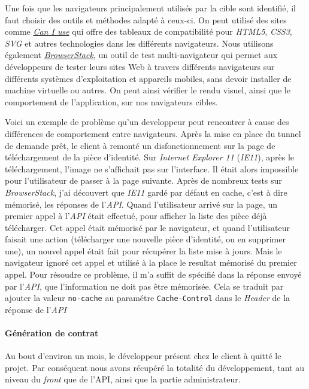 Une fois que les navigateurs principalement utilisés par la cible sont
identifié, il faut choisir des outils et méthodes adapté à ceux-ci. On
peut utilisé des sites comme \href{http://caniuse.com/}{\emph{Can I
use}} qui offre des tableaux de compatibilité pour \emph{HTML5},
\emph{CSS3}, \emph{SVG} et autres technologies dans les différents
navigateurs. Nous utilisons également
\href{https://www.browserstack.com/}{\emph{BrowserStack}}, un outil de
test multi-navigateur qui permet aux développeurs de tester leurs sites
Web à travers différents navigateurs sur différents systèmes
d'exploitation et appareils mobiles, sans devoir installer de machine
virtuelle ou autres. On peut ainsi vérifier le rendu visuel, ainsi que
le comportement de l'application, sur nos navigateurs cibles.

\bigskip

Voici un exemple de problème qu'un developpeur peut rencontrer à cause
des différences de comportement entre navigateurs. Après la mise en
place du tunnel de demande prêt, le client à remonté un
disfonctionnement sur la page de téléchargement de la pièce d'identité.
Sur \emph{Internet Explorer 11} (\emph{IE11}), après le téléchargement,
l'image ne s'affichait pas sur l'interface. Il était alors impossible
pour l'utilisateur de passer à la page suivante. Après de nombreux tests
sur \emph{BrowserStack}, j'ai découvert que \emph{IE11} gardé par défaut
en cache, c'est à dire mémorisé, les réponses de l'\emph{API}. Quand
l'utilisateur arrivé sur la page, un premier appel à l'\emph{API} était
effectué, pour afficher la liste des pièce déjà télécharger. Cet appel
était mémorisé par le navigateur, et quand l'utilisateur faisait une
action (télécharger une nouvelle pièce d'identité, ou en supprimer une),
un nouvel appel était fait pour récupérer la liste mise à jours. Mais le
navigateur ignoré cet appel et utilisé à la place le resultat mémorisé
du premier appel. Pour résoudre ce problème, il m'a suffit de spécifié
dans la réponse envoyé par l'\emph{API}, que l'information ne doit pas
être mémorisée. Cela se traduit par ajouter la valeur \texttt{no-cache}
au paramétre \texttt{Cache-Control} dans le \emph{Header} de la réponse
de l'\emph{API}

\bigskip

\paragraph{Génération de contrat}\label{guxe9nuxe9ration-de-contrat}

Au bout d'environ un mois, le développeur présent chez le client à
quitté le projet. Par conséquent nous avons récupéré la totalité du
développement, tant au niveau du \emph{front} que de l'API, ainsi que la
partie administrateur.

